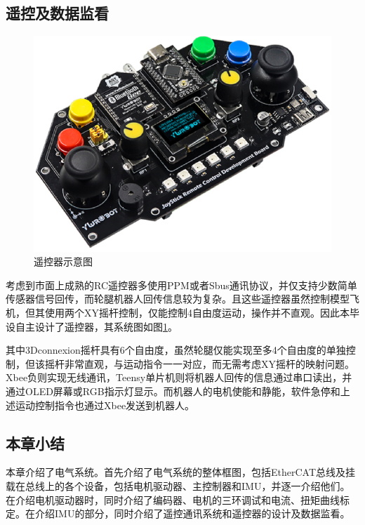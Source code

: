 \subsection{遥控及数据监看}

\begin{figure}[h!]
  \centering
  \includegraphics[width=0.75\linewidth]{figures/Sec3/rmctrl.png}
  \caption{
  遥控器示意图
  }
  \label{fig:sec3-rmctrl}
   \vspace{6pt}
\end{figure}

考虑到市面上成熟的RC遥控器多使用PPM或者Sbus通讯协议，并仅支持少数简单传感器信号回传，而轮腿机器人回传信息较为复杂。且这些遥控器虽然控制模型飞机，但其使用两个XY摇杆控制，仅能控制4自由度运动，操作并不直观。因此本毕设自主设计了遥控器，其系统图如图\ref{fig:sec3-rmctrl}。

其中3Dconnexion摇杆具有6个自由度，虽然轮腿仅能实现至多4个自由度的单独控制，但该摇杆非常直观，与运动指令一一对应，而无需考虑XY摇杆的映射问题。Xbee负则实现无线通讯，Teensy单片机则将机器人回传的信息通过串口读出，并通过OLED屏幕或RGB指示灯显示。而机器人的电机使能和静能，软件急停和上述运动控制指令也通过Xbee发送到机器人。

\subsection{本章小结}

本章介绍了电气系统。首先介绍了电气系统的整体框图，包括EtherCAT总线及挂载在总线上的各个设备，包括电机驱动器、主控制器和IMU，并逐一介绍他们。在介绍电机驱动器时，同时介绍了编码器、电机的三环调试和电流、扭矩曲线标定。在介绍IMU的部分，同时介绍了遥控通讯系统和遥控器的设计及数据监看。
